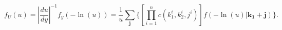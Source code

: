 \documentclass[12pt, draftclsnofoot, onecolumn]{IEEEtran}
\begin{document}
\begin{equation}
f_{U}(u)=|\frac{du}{dy}|^{-1}f_{y}(-\ln(u))=\frac{1}{u}\sum_{\mathbf{j}}\{[\prod_{i=1}^{n}c(k_{1}^{i},k_{2}^{i},j^{i})]f(-\ln(u)|\mathbf{k_{1}}+\mathbf{j})\}.
\label{Appendequal19}
\end{equation}





\ifCLASSOPTIONcaptionsoff
  \newpage
\fi





%
%
%



% 
\end{document}
